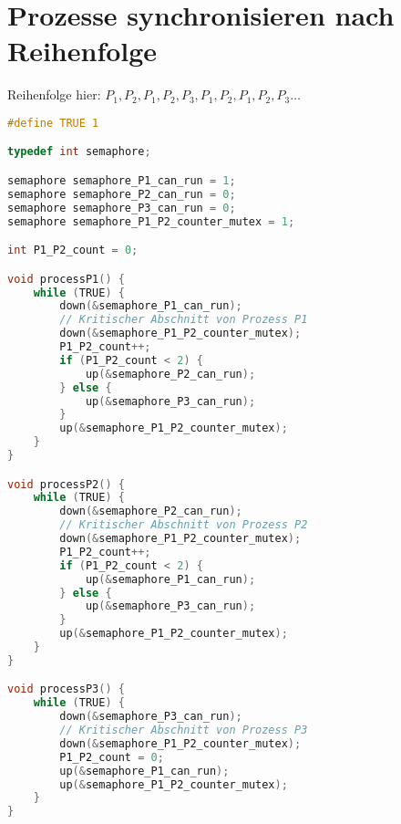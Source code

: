 \newpage

\section{Prozesse synchronisieren nach Reihenfolge}

Reihenfolge hier: $P_1, P_2, P_1, P_2, P_3, P_1, P_2, P_1, P_2, P_3 \dots$

\begin{lstlisting}[language=C]
#define TRUE 1

typedef int semaphore;

semaphore semaphore_P1_can_run = 1;
semaphore semaphore_P2_can_run = 0;
semaphore semaphore_P3_can_run = 0;
semaphore semaphore_P1_P2_counter_mutex = 1;

int P1_P2_count = 0; 

void processP1() {
    while (TRUE) {
        down(&semaphore_P1_can_run);
        // Kritischer Abschnitt von Prozess P1
        down(&semaphore_P1_P2_counter_mutex);
        P1_P2_count++;
        if (P1_P2_count < 2) {
            up(&semaphore_P2_can_run);
        } else {
            up(&semaphore_P3_can_run);
        }
        up(&semaphore_P1_P2_counter_mutex);
    }
}

void processP2() {
    while (TRUE) {
        down(&semaphore_P2_can_run);
        // Kritischer Abschnitt von Prozess P2
        down(&semaphore_P1_P2_counter_mutex);
        P1_P2_count++;
        if (P1_P2_count < 2) {
            up(&semaphore_P1_can_run);
        } else {
            up(&semaphore_P3_can_run);
        }
        up(&semaphore_P1_P2_counter_mutex);
    }
}

void processP3() {
    while (TRUE) {
        down(&semaphore_P3_can_run);
        // Kritischer Abschnitt von Prozess P3
        down(&semaphore_P1_P2_counter_mutex);
        P1_P2_count = 0;
        up(&semaphore_P1_can_run);
        up(&semaphore_P1_P2_counter_mutex);
    }
}
\end{lstlisting}
